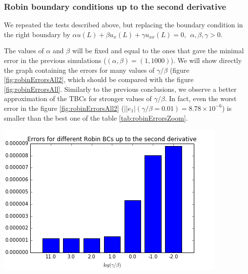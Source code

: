 \subsubsection{Robin boundary conditions up to the second derivative}

\indent We repeated the tests described above, but replacing the boundary condition in the right boundary by $\alpha u(L) + \beta u_x(L) + \gamma u_{xx}(L) = 0,  \ \ \alpha,\beta, \gamma > 0$.

\indent The values of $\alpha$ and $\beta$ will be fixed and equal to the ones that gave the minimal error in the previous simulations ($(\alpha,\beta) = (1,1000)$). We will show directly the graph containing the errors for many values of $\gamma/\beta$ (figure \ref{fig:robinErrorsAll2}, which should be compared with the figure \ref{fig:robinErrorsAll}. Similarly to the previous conclusions, we observe a better approximation of the TBCs for stronger values of $\gamma/\beta$. In fact, even the worst error in the figure \ref{fig:robinErrorsAll2} ($||e_1|(\gamma/\beta = 0.01) = 8.78 \times 10^{-6}$) is smaller than the best one of the table \ref{tab:robinErrorsZoom}.

\begin{center}
		\includegraphics[scale=.6]{figures/robinErrors2.png}
\end{center}
